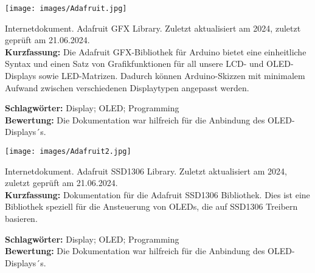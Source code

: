 %
%


{
	\begin{minipage}{0.38\textwidth}
		\texttt{[image: images/Adafruit.jpg]}
	\end{minipage}
	\hfill
	\begin{minipage}{0.6\textwidth}
		Internetdokument. Adafruit GFX Library. Zuletzt aktualisiert am 2024, zuletzt geprüft am 21.06.2024.
		\\ \textbf{Kurzfassung:}
		Die Adafruit GFX-Bibliothek für Arduino bietet eine einheitliche Syntax und einen Satz von Grafikfunktionen für all unsere LCD- und OLED-Displays sowie LED-Matrizen. Dadurch können Arduino-Skizzen mit minimalem Aufwand zwischen verschiedenen Displaytypen angepasst werden.
	\end{minipage}
	\textbf{Schlagwörter:}
	Display; OLED; Programming
	\\ \textbf{Bewertung:}
	Die Dokumentation war hilfreich für die Anbindung des OLED-Displays´s.
}

{
	\begin{minipage}{0.38\textwidth}
		\texttt{[image: images/Adafruit2.jpg]}
	\end{minipage}
	\hfill
	\begin{minipage}{0.6\textwidth}
		Internetdokument. Adafruit SSD1306 Library. Zuletzt aktualisiert am 2024, zuletzt geprüft am 21.06.2024.
		\\ \textbf{Kurzfassung:}
	Dokumentation für die Adafruit SSD1306 Bibliothek. Dies ist eine Bibliothek speziell für die Ansteuerung von OLEDs, die auf SSD1306 Treibern basieren.
	\end{minipage}
	\textbf{Schlagwörter:}
	Display; OLED; Programming
	\\ \textbf{Bewertung:}
	Die Dokumentation war hilfreich für die Anbindung des OLED-Displays´s.
}


